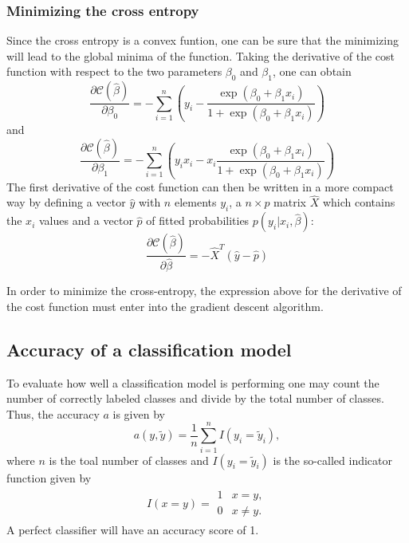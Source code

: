 \documentclass[a4paper,12pt]{article}
\begin{document}
\subsubsection{Minimizing the cross entropy}
Since the cross entropy is a convex funtion, one can be sure that the minimizing will lead to the global minima of the function. Taking the derivative of the cost function with respect to the two parameters $\beta_0$ and $\beta_1$, one can obtain
\begin{equation*}
    \frac{\partial \mathcal{C}(\hat{\beta})}{\partial \beta_0} = -\sum_{i=1}^n  \left(y_i -\frac{\exp{(\beta_0+\beta_1x_i)}}{1+\exp{(\beta_0+\beta_1x_i)}}\right)
\end{equation*}
and
\begin{equation*}
    \frac{\partial \mathcal{C}(\hat{\beta})}{\partial \beta_1} = -\sum_{i=1}^n  \left(y_ix_i -x_i\frac{\exp{(\beta_0+\beta_1x_i)}}{1+\exp{(\beta_0+\beta_1x_i)}}\right)
\end{equation*}
The first derivative of the cost function can then be written in a more compact way by defining a vector $\hat{y}$ with $n$ elements $y_i$, a
$n\times p$ matrix $\hat{X}$ which contains the $x_i$ values and a
vector $\hat{p}$ of fitted probabilities $p(y_i\vert x_i,\hat{\beta})$:
\begin{equation}
    \frac{\partial \mathcal{C}(\hat{\beta})}{\partial \hat{\beta}} = -\hat{X}^T\left(\hat{y}-\hat{p}\right)
\end{equation}

In order to minimize the cross-entropy, the expression above for the derivative of the cost function must enter into the gradient descent algorithm.\newline


\subsection{Accuracy of a classification model}
To evaluate how well a classification model is performing one may count the number of correctly labeled classes and divide by the total number of classes. Thus, the accuracy $a$ is given by
\begin{equation}
    a(y,\tilde{y}) = \frac{1}{n}\sum_{i=1}^n I(y_i = \tilde{y}_i),
\end{equation}
where $n$ is the toal number of classes and $I(y_i = \tilde{y}_i)$ is the so-called indicator function given by
\begin{align}
    I(x = y) = \begin{array}{cc}
    1 & x = y, \\
    0 & x \neq y.
    \end{array}
\end{align}
A perfect classifier will have an accuracy score of 1.
\end{document}

